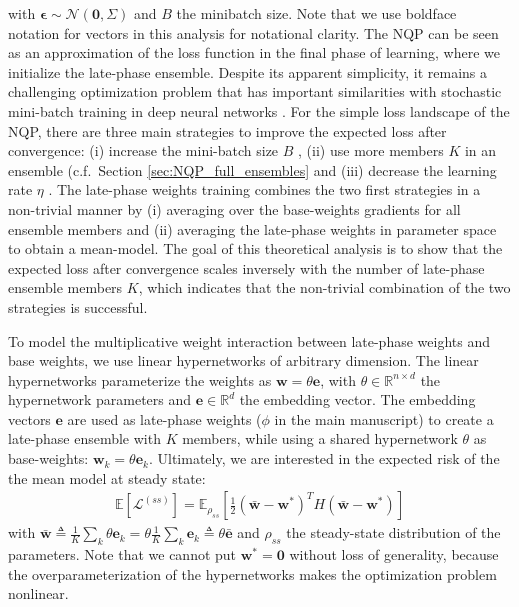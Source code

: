 \documentclass{article} \usepackage{iclr2021_conference,times}
\begin{document}
with $\boldsymbol{\epsilon} \sim \mathcal{N}(\mathbf{0}, \Sigma)$ and $B$ the minibatch size. Note that we use boldface notation for vectors in this analysis for notational clarity. The NQP can be seen as an approximation of the loss function in the final phase of learning, where we initialize the late-phase ensemble. Despite its apparent simplicity, it remains a challenging optimization problem that has important similarities with stochastic mini-batch training in deep neural networks \citep{schaul_no_2013, martens_second-order_2016, wu_understanding_2018, zhang_which_2019, zhang_lookahead_2019}. For the simple loss landscape of the NQP, there are three main strategies to improve the expected loss after convergence: (i) increase the mini-batch size $B$ \citep{zhang_which_2019}, (ii) use more members $K$ in an ensemble (c.f.~Section \ref{sec:NQP_full_ensembles} and (iii) decrease the learning rate $\eta$ \citep{schaul_no_2013, martens_second-order_2016, wu_understanding_2018, zhang_which_2019, zhang_lookahead_2019}. The late-phase weights training combines the two first strategies in a non-trivial manner by (i) averaging over the base-weights gradients for all ensemble members and (ii) averaging the late-phase weights in parameter space to obtain a mean-model. The goal of this theoretical analysis is to show that the expected loss after convergence scales inversely with the number of late-phase ensemble members $K$, which indicates that the non-trivial combination of the two strategies is successful.

To model the multiplicative weight interaction between late-phase weights and base weights, we use linear hypernetworks of arbitrary dimension. The linear hypernetworks parameterize the weights as $\mathbf{w} = \theta \mathbf{e}$, with $\theta \in \mathbb{R}^{n \times d}$ the hypernetwork parameters and $\mathbf{e} \in \mathbb{R}^{d}$ the embedding vector. The embedding vectors $\mathbf{e}$ are used as late-phase weights ($\phi$ in the main manuscript) to create a late-phase ensemble with $K$ members, while using a shared hypernetwork $\theta$ as base-weights: $\mathbf{w}_k = \theta \mathbf{e}_k$. Ultimately, we are interested in the expected risk of the the mean model at steady state: 
\begin{align}\label{eq:risk_meanmodel}
    \mathbb{E}[\mathcal{L}^{(ss)}] =  \mathbb{E}_{\rho_{ss}}[\frac{1}{2}(\bar{\mathbf{w}}- \mathbf{w}^*)^T H (\bar{\mathbf{w}}-\mathbf{w}^*)]
\end{align}
with $\bar{\mathbf{w}} \triangleq \frac{1}{K}\sum_k \theta \mathbf{e}_k = \theta \frac{1}{K}\sum_k \mathbf{e}_k \triangleq \theta \bar{\mathbf{e}}$ and $\rho_{ss}$ the steady-state distribution of the parameters. Note that we cannot put $\mathbf{w}^*=\mathbf{0}$ without loss of generality, because the overparameterization of the hypernetworks makes the optimization problem nonlinear.
\end{document}
